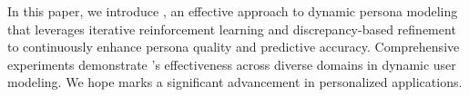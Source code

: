 In this paper, we introduce \method, an effective approach to dynamic persona modeling that leverages iterative reinforcement learning and discrepancy-based refinement to continuously enhance persona quality and predictive accuracy. Comprehensive experiments demonstrate \method’s effectiveness across diverse domains in dynamic user modeling. We hope \method marks a significant advancement in personalized applications.